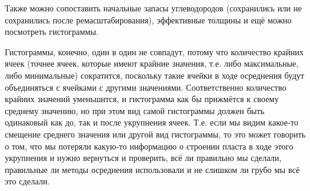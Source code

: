 Также можно сопоставить начальные запасы углеводородов (сохранились или не сохранились после ремасштабирования), эффективные толщины и ещё можно посмотреть гистограммы.

Гистограммы, конечно, один в один не совпадут, потому что количество крайних ячеек (точнее ячеек, которые имеют крайние значения, т.е. либо максимальные, либо минимальные) сократится, поскольку такие ячейки в ходе осреднения будут объединяться с ячейками с другими значениями.
Соответственно количество крайних значений уменьшится, и гистограмма как бы прижмётся к своему среднему значению, но при этом вид самой гистограммы должен быть одинаковый как до, так и после укрупнения ячеек.
Т.е. если мы видим какое-то смещение среднего значения или другой вид гистограммы, то это может говорить о том, что мы потеряли какую-то информацию о строении пласта в ходе этого укрупнения и нужно вернуться и проверить, всё ли правильно мы сделали, правильные ли методы осреднения использовали и не слишком ли грубо мы всё это сделали.

